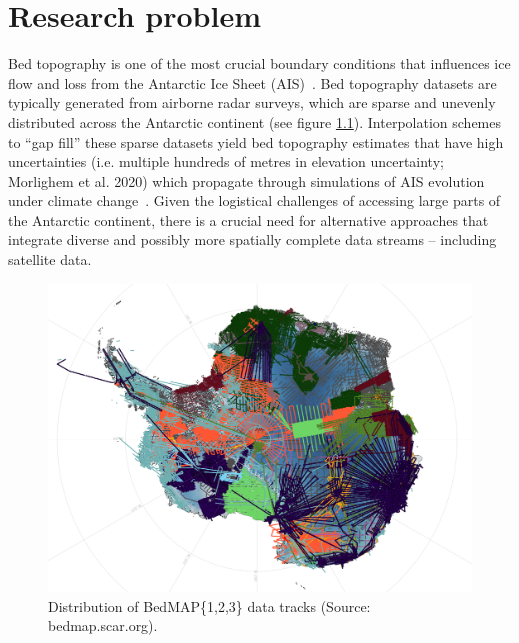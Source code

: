 \chapter{Research problem}\label{review}
Bed topography is one of the most crucial boundary conditions that influences ice flow and loss from the Antarctic Ice Sheet (AIS)~\cite{Morlighem_2020}. Bed topography datasets are typically generated from airborne radar surveys, which are sparse and unevenly distributed across the Antarctic continent (see figure \ref{fig:BedMAP}). Interpolation schemes to ``gap fill'' these sparse datasets yield bed topography estimates that have high uncertainties (i.e. multiple hundreds of metres in elevation uncertainty; Morlighem et al. 2020) which propagate through simulations of AIS evolution under climate change~\cite{Castleman_2022}. Given the logistical challenges of accessing large parts of the Antarctic continent, there is a crucial need for alternative approaches that integrate diverse and possibly more spatially complete data streams – including satellite data.
\begin{figure}[H]
    \includegraphics[scale=0.31]{bedmap.png}
    \caption{Distribution of BedMAP\{1,2,3\} data tracks (Source: bedmap.scar.org).}
    \label{fig:BedMAP}
\end{figure}
\newpage

